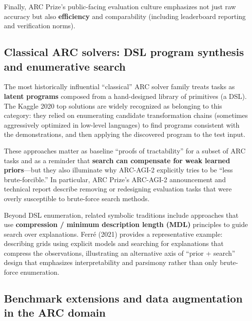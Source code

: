 \documentclass[11pt]{article}
\begin{document}
Finally, ARC Prize's public-facing evaluation culture emphasizes not
just raw accuracy but also \textbf{efficiency} and comparability
(including leaderboard reporting and verification norms).

\hypertarget{classical-arc-solvers-dsl-program-synthesis-and-enumerative-search}{%
\subsection{Classical ARC solvers: DSL program synthesis and enumerative
search}\label{classical-arc-solvers-dsl-program-synthesis-and-enumerative-search}}

The most historically influential ``classical'' ARC solver family treats
tasks as \textbf{latent programs} composed from a hand-designed library
of primitives (a DSL). The Kaggle 2020 top solutions are widely
recognized as belonging to this category: they relied on enumerating
candidate transformation chains (sometimes aggressively optimized in
low-level languages) to find programs consistent with the
demonstrations, and then applying the discovered program to the test
input.

These approaches matter as baseline ``proofs of tractability'' for a
subset of ARC tasks and as a reminder that \textbf{search can compensate
for weak learned priors}---but they also illuminate why ARC-AGI-2
explicitly tries to be ``less brute-forcible.'' In particular, ARC
Prize's ARC-AGI-2 announcement and technical report describe removing or
redesigning evaluation tasks that were overly susceptible to brute-force
search methods.

Beyond DSL enumeration, related symbolic traditions include approaches
that use \textbf{compression / minimum description length (MDL)}
principles to guide search over explanations. Ferré (2021) provides a
representative example: describing grids using explicit models and
searching for explanations that compress the observations, illustrating
an alternative axis of ``prior + search'' design that emphasizes
interpretability and parsimony rather than only brute-force enumeration.

\hypertarget{benchmark-extensions-and-data-augmentation-in-the-arc-domain}{%
\subsection{Benchmark extensions and data augmentation in the ARC
domain}\label{benchmark-extensions-and-data-augmentation-in-the-arc-domain}}
\end{document}
